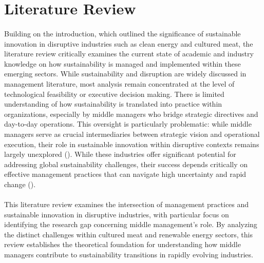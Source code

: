 	\section{Literature Review}
	\label{sec:litreview}
	
	\paragraph*{} Building on the introduction, which outlined the significance of sustainable innovation in disruptive industries such as clean energy and cultured meat, the literature review critically examines the current state of academic and industry knowledge on how sustainability is managed and implemented within these emerging sectors. While sustainability and disruption are widely discussed in management literature, most analysis remain concentrated at the level of technological feasibility or executive decision making. There is limited understanding of how sustainability is translated into practice within organizations, especially by middle managers who bridge strategic directives and day-to-day operations. This oversight is particularly problematic: while middle managers serve as crucial intermediaries between strategic vision and operational execution, their role in sustainable innovation within disruptive contexts remains largely unexplored (\textcite{Floyd1997}). While these industries offer significant potential for addressing global sustainability challenges, their success depends critically on effective management practices that can navigate high uncertainty and rapid change (\textcite{Christensen1997}).
	
	\paragraph*{} This literature review examines the intersection of management practices and sustainable innovation in disruptive industries, with particular focus on identifying the research gap concerning middle management’s role. By analyzing the distinct challenges within cultured meat and renewable energy sectors, this review establishes the theoretical foundation for understanding how middle managers contribute to sustainability transitions in rapidly evolving industries.
	
